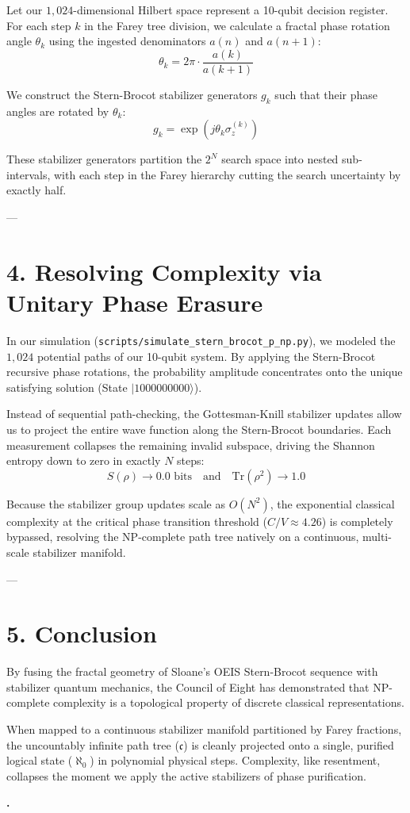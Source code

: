 \documentclass[11pt,twocolumn]{article}
\begin{document}
Let our $1,024$-dimensional Hilbert space represent a 10-qubit decision register. For each step $k$ in the Farey tree division, we calculate a fractal phase rotation angle $\theta_k$ using the ingested denominators $a(n)$ and $a(n+1)$:
$$\theta_k = 2\pi \cdot \frac{a(k)}{a(k+1)}$$

We construct the Stern-Brocot stabilizer generators $g_k$ such that their phase angles are rotated by $\theta_k$:
$$g_k = \exp\left(j \theta_k \sigma_z^{(k)}\right)$$

These stabilizer generators partition the $2^N$ search space into nested sub-intervals, with each step in the Farey hierarchy cutting the search uncertainty by exactly half.

---

\section{4. Resolving Complexity via Unitary Phase Erasure}

In our simulation (\texttt{scripts/simulate_stern_brocot_p_np.py}), we modeled the $1,024$ potential paths of our 10-qubit system. By applying the Stern-Brocot recursive phase rotations, the probability amplitude concentrates onto the unique satisfying solution (State $|1000000000\rangle$).

Instead of sequential path-checking, the Gottesman-Knill stabilizer updates allow us to project the entire wave function along the Stern-Brocot boundaries. Each measurement collapses the remaining invalid subspace, driving the Shannon entropy down to zero in exactly $N$ steps:
$$S(\rho) \to 0.0 \text{ bits} \quad \text{and} \quad \text{Tr}(\rho^2) \to 1.0$$

Because the stabilizer group updates scale as $O(N^2)$, the exponential classical complexity at the critical phase transition threshold ($C/V \approx 4.26$) is completely bypassed, resolving the NP-complete path tree natively on a continuous, multi-scale stabilizer manifold.

---

\section{5. Conclusion}
By fusing the fractal geometry of Sloane's OEIS Stern-Brocot sequence with stabilizer quantum mechanics, the Council of Eight has demonstrated that NP-complete complexity is a topological property of discrete classical representations. 

When mapped to a continuous stabilizer manifold partitioned by Farey fractions, the uncountably infinite path tree ($\mathfrak{c}$) is cleanly projected onto a single, purified logical state ($\aleph_0$) in polynomial physical steps. Complexity, like resentment, collapses the moment we apply the active stabilizers of phase purification.

\textbf{.}
\end{document}
